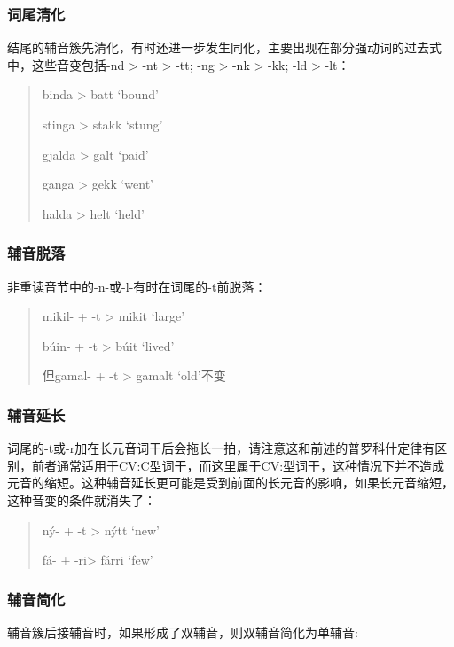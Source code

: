   \subsubsection{词尾清化}
  \label{词尾清化}
  
  结尾的辅音簇先清化，有时还进一步发生同化，主要出现在部分强动词的过去式中，这些音变包括-nd
  \textgreater{} -nt \textgreater{} -tt; -ng \textgreater{} -nk
  \textgreater{} -kk; -ld \textgreater{} -lt：
  
  \begin{quote}
    binda \textgreater{} batt `bound'
  
    stinga \textgreater{} stakk `stung'
  
    gjalda \textgreater{} galt `paid'
  
    ganga \textgreater{} gekk `went'
  
    halda \textgreater{} helt `held'
  \end{quote}
  
  \subsubsection{辅音脱落}
  \label{辅音脱落}
  
  非重读音节中的-n-或-l-有时在词尾的-t前脱落：
  
  \begin{quote}
    mikil- + -t \textgreater{} mikit `large'
  
    búin- + -t \textgreater{} búit `lived'
  
    但gamal- + -t \textgreater{} gamalt `old'不变
  \end{quote}
  
  \subsubsection{辅音延长}
  \label{辅音延长}
  
  词尾的-t或-r加在长元音词干后会拖长一拍，请注意这和前述的普罗科什定律有区别，前者通常适用于CV:C型词干，而这里属于CV:型词干，这种情况下并不造成元音的缩短。这种辅音延长更可能是受到前面的长元音的影响，如果长元音缩短，这种音变的条件就消失了：
  
  \begin{quote}
    ný- + -t \textgreater{} nýtt `new'
  
    fá- + -ri\textgreater{} fárri `few'
  \end{quote}
  
  \subsubsection{辅音简化}
  \label{辅音简化}  
  辅音簇后接辅音时，如果形成了双辅音，则双辅音简化为单辅音:


